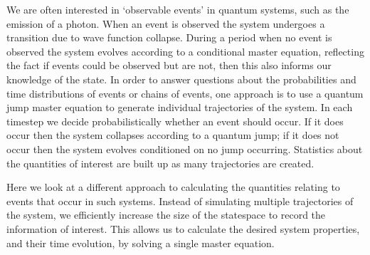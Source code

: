 We are often interested in `observable events' in quantum systems, such as the emission of a photon. When an event is observed the system undergoes a transition due to wave function collapse. During a period when no event is observed the system evolves according to a conditional master equation, reflecting the fact if events could be observed but are not, then this also informs our knowledge of the state. In order to answer questions about the probabilities and time distributions of events or chains of events, one approach is to use a quantum jump master equation to generate individual trajectories of the system. In each timestep we decide probabilistically whether an event should occur. If it does occur then the system collapses according to a quantum jump; if it does not occur then the system evolves conditioned on no jump occurring. Statistics about the quantities of interest are built up as many trajectories are created.

Here we look at a different approach to calculating the quantities relating to events that occur in such systems. Instead of simulating multiple trajectories of the system, we efficiently increase the size of the statespace to record the information of interest. This allows us to calculate the desired system properties, and their time evolution, by solving a single master equation. 

